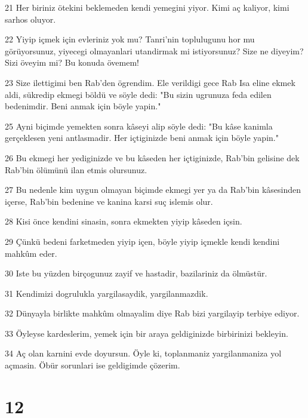 \par 21 Her biriniz ötekini beklemeden kendi yemegini yiyor. Kimi aç kaliyor, kimi sarhos oluyor.
\par 22 Yiyip içmek için evleriniz yok mu? Tanri'nin toplulugunu hor mu görüyorsunuz, yiyecegi olmayanlari utandirmak mi istiyorsunuz? Size ne diyeyim? Sizi öveyim mi? Bu konuda övemem!
\par 23 Size ilettigimi ben Rab'den ögrendim. Ele verildigi gece Rab Isa eline ekmek aldi, sükredip ekmegi böldü ve söyle dedi: "Bu sizin ugrunuza feda edilen bedenimdir. Beni anmak için böyle yapin."
\par 25 Ayni biçimde yemekten sonra kâseyi alip söyle dedi: "Bu kâse kanimla gerçeklesen yeni antlasmadir. Her içtiginizde beni anmak için böyle yapin."
\par 26 Bu ekmegi her yediginizde ve bu kâseden her içtiginizde, Rab'bin gelisine dek Rab'bin ölümünü ilan etmis olursunuz.
\par 27 Bu nedenle kim uygun olmayan biçimde ekmegi yer ya da Rab'bin kâsesinden içerse, Rab'bin bedenine ve kanina karsi suç islemis olur.
\par 28 Kisi önce kendini sinasin, sonra ekmekten yiyip kâseden içsin.
\par 29 Çünkü bedeni farketmeden yiyip içen, böyle yiyip içmekle kendi kendini mahkûm eder.
\par 30 Iste bu yüzden birçogunuz zayif ve hastadir, bazilariniz da ölmüstür.
\par 31 Kendimizi dogrulukla yargilasaydik, yargilanmazdik.
\par 32 Dünyayla birlikte mahkûm olmayalim diye Rab bizi yargilayip terbiye ediyor.
\par 33 Öyleyse kardeslerim, yemek için bir araya geldiginizde birbirinizi bekleyin.
\par 34 Aç olan karnini evde doyursun. Öyle ki, toplanmaniz yargilanmaniza yol açmasin. Öbür sorunlari ise geldigimde çözerim.

\chapter{12}

